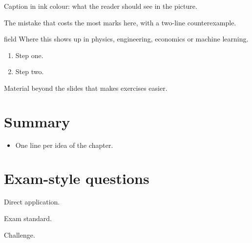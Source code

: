 \begin{center}
\hspace{0.4cm}

{\small\color{ink} Caption in ink colour: what the reader should see in the picture.}
\end{center}

\begin{trap}
The mistake that costs the most marks here, with a two-line counterexample.
\end{trap}

\begin{reallife}{field}
Where this shows up in physics, engineering, economics or machine learning.
\end{reallife}

\begin{recipe}
\begin{enumerate}
  \item Step one. \item Step two.
\end{enumerate}
\end{recipe}

\begin{extra}
Material beyond the slides that makes exercises easier.
\end{extra}

\section{Summary}
\begin{keyidea}
\begin{itemize}
  \item One line per idea of the chapter.
\end{itemize}
\end{keyidea}

\section{Exam-style questions}
\begin{exercise}[1]
Direct application.
\end{exercise}
\begin{exercise}[2]
Exam standard.
\end{exercise}
\begin{exercise}[3]
Challenge.
\end{exercise}

